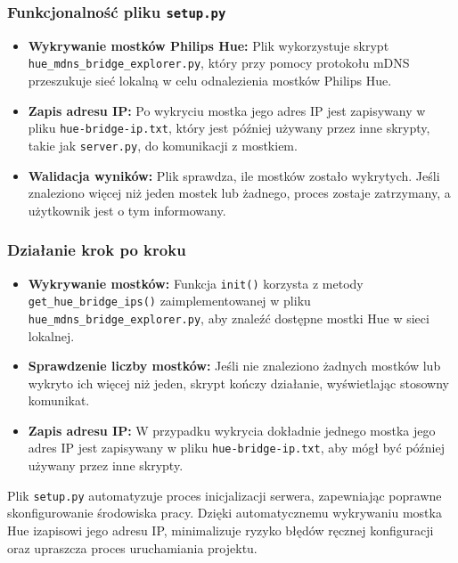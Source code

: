 \documentclass[12pt]{article}
\begin{document}
\subsubsection*{Funkcjonalność pliku \texttt{setup.py}}
\begin{itemize}
    \item \textbf{Wykrywanie mostków Philips Hue:} Plik wykorzystuje skrypt\\\texttt{hue\_mdns\_bridge\_explorer.py}, który przy pomocy protokołu mDNS przeszukuje
          sieć lokalną w celu odnalezienia mostków Philips Hue.
    \item \textbf{Zapis adresu IP:} Po wykryciu mostka jego adres IP jest zapisywany w pliku \texttt{hue-bridge-ip.txt}, który jest później używany przez inne skrypty,
          takie jak \texttt{server.py}, do komunikacji z mostkiem.
    \item \textbf{Walidacja wyników:} Plik sprawdza, ile mostków zostało wykrytych. Jeśli znaleziono więcej niż jeden mostek lub żadnego, proces zostaje zatrzymany,
          a użytkownik jest o tym informowany.
\end{itemize}

\subsubsection*{Działanie krok po kroku}
\begin{itemize}
    \item \textbf{Wykrywanie mostków:} Funkcja \texttt{init()} korzysta z metody\\\texttt{get\_hue\_bridge\_ips()} zaimplementowanej w pliku \texttt{hue\_mdns\_bridge\_explorer.py},
    aby znaleźć dostępne mostki Hue w sieci lokalnej.
    \item \textbf{Sprawdzenie liczby mostków:} Jeśli nie znaleziono żadnych mostków lub wykryto ich więcej niż jeden, skrypt kończy działanie, wyświetlając stosowny komunikat. 
    \item \textbf{Zapis adresu IP:} W przypadku wykrycia dokładnie jednego mostka jego adres IP jest zapisywany w pliku \texttt{hue-bridge-ip.txt}, aby mógł być później używany przez inne skrypty.
\end{itemize}
Plik \texttt{setup.py} automatyzuje proces inicjalizacji serwera, zapewniając poprawne skonfigurowanie środowiska pracy. Dzięki automatycznemu wykrywaniu mostka Hue
izapisowi jego adresu IP, minimalizuje ryzyko błędów ręcznej konfiguracji oraz upraszcza proces uruchamiania projektu.
\end{document}
